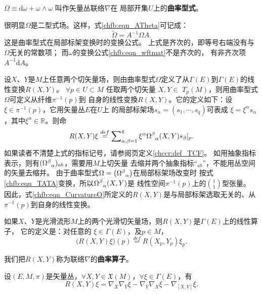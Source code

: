 \begin{definition}
    $\Omega \equiv \mathrm{d}\omega +  \omega\wedge\omega$ 叫作矢量丛联络$\nabla$在
    局部开集$U$上的\textbf{曲率型式}。
\end{definition}

很明显$\Omega$是二型式场。这样，式\eqref{chfb:eqn_ATheta}可记成：
\begin{equation}\label{chfb:eqn_TATA}
    \widetilde{\Omega} =A^{-1} \Omega A .
\end{equation}
这是曲率型式在局部标架变换时的变换公式。
上式是齐次的，即等号右端没有与$\Omega$无关的常数项；
而$\omega$的变换公式\eqref{chfb:eqn_wftmat}不是齐次的，
有非齐次项$A^{-1} \mathrm{d}A$。


设$X$、$Y$是$M$上任意两个切矢量场，则由曲率型式$\Omega$定义了从$\Gamma(E)$到$\Gamma(E)$的线性变换$R(X, Y)$。
$\forall p \in U\subset M$ 任取两个切矢量 $X, Y \in$ $T_p(M)$，则用曲率型式$\Omega$可定义从纤维$\pi^{-1}(p)$到
自身的线性变換$R(X, Y)$。它的定义如下：设 $\xi \in \pi^{-1}(p)$，它用矢量丛$E$在$U$上
的局部标架场$s_\alpha=\left(s_1, \cdots, s_q\right)$可表成
$\xi = \xi^\alpha s_{\alpha}$，其中$\xi^\alpha \in \mathbb{R}$。则命
\begin{equation}\label{chfb:eqn_CurvatureO}
    R(X, Y) \xi \overset{def}{=}\sum\nolimits_{\alpha, \beta=1}^q \xi^\alpha 
    \Omega_{\hphantom{\alpha}\alpha}^\beta(X, Y) s_{\beta}|_p .
\end{equation}
如果读者不清楚上式的指标记号，请参阅\pageref{chccr:def_TCF}页定义\ref{chccr:def_TCF}。
如用抽象指标表示，则有$(\Omega_{\hphantom{\alpha}\alpha}^\beta)_{ab}$，需要用$M$上切矢量
去缩并两个抽象指标“${}_{ab}$”，不能用丛空间的矢量去缩并。
由于曲率型式$\Omega=\left(\Omega_{\hphantom{\alpha}\alpha}^\beta\right)$在局部标架场改变时
按式\eqref{chfb:eqn_TATA}变换，所以$\Omega_{\hphantom{\alpha}\alpha}^\beta(X, Y)$是
线性空间$\pi^{-1}(p)$上的$\binom{1}{1}$型张量。
因此，式\eqref{chfb:eqn_CurvatureO}所定义的$R(X, Y)$是与局部标架选取无关的、从$\pi^{-1}(p)$到自身的线性变换。

如果$X$、$Y$是光滑流形$M$上的两个光滑切矢量场，则$R(X, Y)$是$\Gamma(E)$上的线性算子，
它的定义是：对任意的 $\xi \in \Gamma(E)$，及$p \in  M$，
\begin{equation}\label{chfb:eqn_RppR}
    \bigl(R(X, Y) \xi \bigr)(p)\overset{def}{=}R\left(X_p, Y_p\right) \xi_p .
\end{equation}

我们把$R(X, Y)$称为联络$\nabla$的\textbf{曲率算子}。

\begin{theorem}\label{chfb:thm_Riemann-Curvature}
    设$(E,M,\pi)$是矢量丛，$\forall X, Y\in \mathfrak{X}(M)$，$\forall \xi \in \Gamma(E)$，有
    \begin{equation}\label{chfb:eqn_Riemann-Curvature}
       R(X, Y)\xi=\nabla_X \nabla_Y\xi- \nabla_Y \nabla_X\xi-\nabla_{[X, Y]}\xi .
    \end{equation}
\end{theorem}

